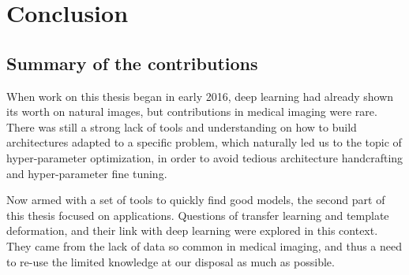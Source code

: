 \chapter{Conclusion}
\label{chap:conclusion}

\section{Summary of the contributions}

When work on this thesis began in early 2016, deep learning had already shown its worth on natural images, but contributions in medical imaging were rare. There was still a strong lack of tools and understanding on how to build architectures adapted to a specific problem, which naturally led us to the topic of hyper-parameter optimization, in order to avoid tedious architecture handcrafting and hyper-parameter fine tuning. 

Now armed with a set of tools to quickly find good models, the second part of this thesis focused on applications. Questions of transfer learning and template deformation, and their link with deep learning were explored in this context. They came from the lack of data so common in medical imaging, and thus a need to re-use the limited knowledge at our disposal as much as possible. 

